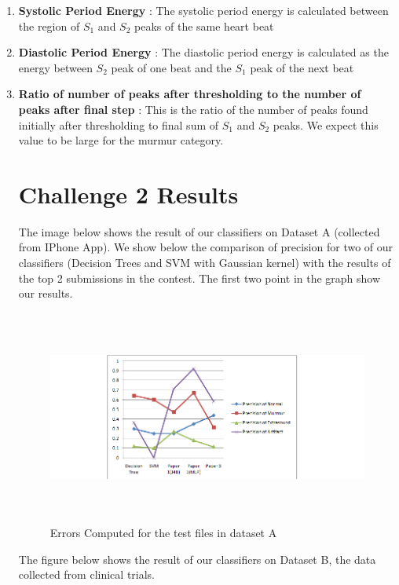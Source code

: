 \documentclass{article}
\begin{document}
\begin{enumerate}
\item \textbf{Systolic Period Energy} : The systolic period energy is calculated between the region of $S_1$ and $S_2$ peaks of the same heart beat
\item \textbf{Diastolic Period Energy} : The diastolic period energy is calculated as the energy between $S_2$ peak of one beat and the $S_1$ peak of the next beat
\item \textbf{Ratio of number of peaks after thresholding to the number of peaks after final step} : This is the ratio of the number of peaks found initially after thresholding to final sum of $S_1$ and $S_2$ peaks. We expect this value to be large for the murmur category.

\section{Challenge 2 Results}
The image below shows the result of our classifiers on Dataset A (collected from IPhone App). We show below the comparison of precision for two of our classifiers (Decision Trees and SVM with Gaussian kernel) with the results of the top 2 submissions in the contest. The first two point in the graph show our results. \\

\begin{figure}
\begin{center}
\includegraphics[height=200pt, width=450pt]{Dataseta.png}
\caption{Errors Computed for the test files in dataset A}
\end{center}
\end{figure}

The figure below shows the result of our classifiers on Dataset B, the data collected from clinical trials.\\


\end{enumerate}
\end{document}
